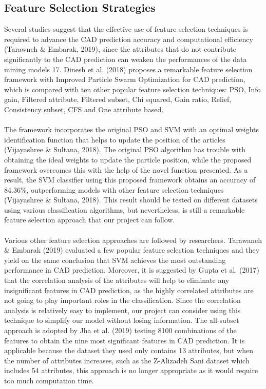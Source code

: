 \documentclass[a4paper, 12pt]{article}
\begin{document}
    \subsection{Feature Selection Strategies}
    Several studies suggest that the effective use of feature selection techniques is required to advance the CAD prediction accuracy and computational efficiency (Tarawneh \& Embarak, 2019), since the attributes that do not contribute significantly to the CAD prediction can weaken the performances of the data mining models 17. Dinesh et al. (2018) proposes a remarkable feature selection framework with Improved Particle Swarm Optimization for CAD prediction, which is compared with ten other popular feature selection techniques: PSO, Info gain, Filtered attribute, Filtered subset, Chi squared, Gain ratio, Relief, Consistency subset, CFS and One attribute based. 
    \\\\
    The framework incorporates the original PSO and SVM with an optimal weights identification function that helps to update the position of the articles (Vijayashree \& Sultana, 2018). The original PSO algorithm has trouble with obtaining the ideal weights to update the particle position, while the proposed framework overcomes this with the help of the novel function presented. As a result, the SVM classifier using this proposed framework obtains an accuracy of 84.36\%, outperforming models with other feature selection techniques (Vijayashree \& Sultana, 2018). This result should be tested on different datasets using various classification algorithms, but nevertheless, is still a remarkable feature selection approach that our project can follow.
    \\\\
    Various other feature selection approaches are followed by researchers. Tarawaneh \& Embarak (2019) evaluated a few popular feature selection techniques and they yield on the same conclusion that SVM achieves the most outstanding performance in CAD prediction. Moreover, it is suggested by Gupta et al. (2017) that the correlation analysis of the attributes will help to eliminate any insignificant features in CAD prediction, as the highly correlated attributes are not going to play important roles in the classification. Since the correlation analysis is relatively easy to implement, our project can consider using this technique to simplify our model without losing information. The all-subset approach is adopted by Jha et al. (2019) testing 8100 combinations of the features to obtain the nine most significant features in CAD prediction. It is applicable because the dataset they used only contains 13 attributes, but when the number of attributes increases, such as the Z-Alizadeh Sani dataset which includes 54 attributes, this approach is no longer appropriate as it would require too much computation time. 
    
\end{document}
